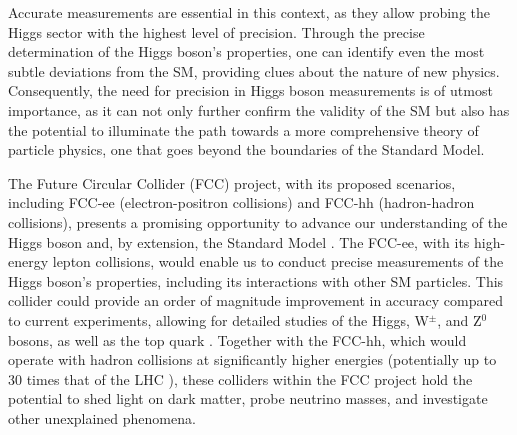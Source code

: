 Accurate measurements are essential in this context, as they allow probing the Higgs sector with the highest level of precision. Through the precise determination of the Higgs boson's properties, one can identify even the most subtle deviations from the SM, providing clues about the nature of new physics. Consequently, the need for precision in Higgs boson measurements is of utmost importance, as it can not only further confirm the validity of the SM but also has the potential to illuminate the path towards a more comprehensive theory of particle physics, one that goes beyond the boundaries of the Standard Model.

The Future Circular Collider (FCC) project, with its proposed scenarios, including FCC-ee (electron-positron collisions) and FCC-hh (hadron-hadron collisions), presents a promising opportunity to advance our understanding of the Higgs boson and, by extension, the Standard Model \cite{FCC:2018byv}. The FCC-ee, with its high-energy lepton collisions, would enable us to conduct precise measurements of the Higgs boson's properties, including its interactions with other SM particles. This collider could provide an order of magnitude improvement in accuracy compared to current experiments, allowing for detailed studies of the Higgs, W$^\pm$, and Z$^0$ bosons, as well as the top quark \cite{Ellis:2015sca, dEnterria:2016fpc}. Together with the FCC-hh, which would operate with hadron collisions at significantly higher energies (potentially up to 30 times that of the LHC \cite{FCC:2018vvp}), these colliders within the FCC project hold the potential to shed light on dark matter, probe neutrino masses, and investigate other unexplained phenomena.
